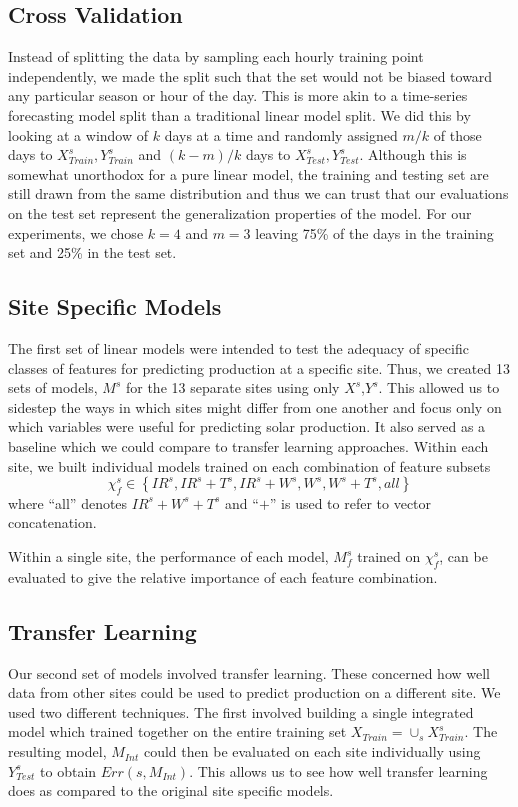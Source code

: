 \documentclass[11pt, fullpage,letterpaper]{article}
\begin{document}
\subsection{Cross Validation}

Instead of splitting the data by sampling each hourly training point independently, we made the split such that the set would not be biased toward any particular season or hour of the day. This is more akin to a time-series forecasting model split than a traditional linear model split. We did this by looking at a window of $k$ days at a time and randomly assigned $m / k$ of those days to $X^s_{Train},Y^s_{Train}$ and $(k - m) / k$ days to $X^s_{Test},Y^s_{Test}$. Although this is somewhat unorthodox for a pure linear model, the training and testing set are still drawn from the same distribution and thus we can trust that our evaluations on the test set represent the generalization properties of the model. For our experiments, we chose $k=4$ and $m=3$ leaving 75\% of the days in the training set and 25\% in the test set.

\subsection{Site Specific Models}

The first set of linear models were intended to test the adequacy of specific classes of features for predicting production at a specific site. Thus, we created 13 sets of models, $M^s$ for the 13 separate sites using only $X^s$,$Y^s$. This allowed us to sidestep the ways in which sites might differ from one another and focus only on which variables were useful for predicting solar production. It also served as a baseline which we could compare to transfer learning approaches.
Within each site, we built individual models trained on each combination of feature subsets
\[
    \chi_f^s \in \left\{ IR^s,IR^s + T^s, IR^s + W^s, W^s,W^s + T^s, all \right\}
\] 
where ``all'' denotes $IR^s+W^s+T^s$ and ``$+$'' is used to refer to vector concatenation. 

Within a single site, the performance of each model, $M_f^s$ trained on $\chi_f^s$, can be evaluated to give the relative importance of each feature combination.

\subsection{Transfer Learning}

Our second set of models involved transfer learning. These concerned how well data from other sites could be used to predict production on a different site. We used two different techniques. The first involved building a single integrated model which trained together on the entire training set $X_{Train}=\cup_s X^s_{Train}$. The resulting model, $M_{Int}$ could then be evaluated on each site individually using $Y^s_{Test}$ to obtain $Err(s,M_{Int})$. This allows us to see how well transfer learning does as compared to the original site specific models. 
\end{document}
